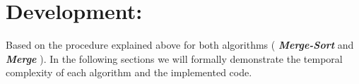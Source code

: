 \section{Development:}

Based on the procedure explained above for both algorithms ( {\bfseries\itshape Merge-Sort} and {\bfseries\itshape Merge} ). In the following sections we will formally demonstrate the temporal complexity  of each algorithm and the implemented code.
